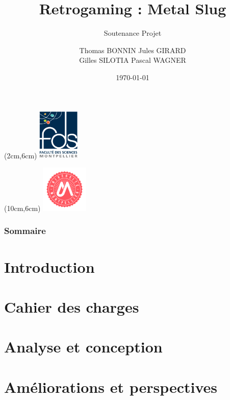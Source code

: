 \documentclass{beamer}
\title[Présentation]{Retrogaming : Metal Slug}
\subtitle[\ldots]{Soutenance Projet}
\author[BONNIN GIRARD SILOTIA WAGNER]{Thomas BONNIN Jules GIRARD \\ Gilles SILOTIA Pascal WAGNER}
\institute[UM2]{Université de Montpellier}
\institute[UM2]{Université de Montpellier \\ Faculté des Sciences}
\date{\today}
\begin{document}
		
		\begingroup
			\makeatletter
				\setlength{\hoffset}{-.5\beamer@sidebarwidth}
			\makeatother
			\begin{frame}[plain]
				\begin{textblock*}{2cm}(2cm,6cm) %
					\includegraphics[width=2cm]{figures/logo_fds.png}
				\end{textblock*}
				\begin{textblock*}{2.25cm}(10cm,6cm) %
					\includegraphics[width=2.25cm]{figures/logo_um.png}
				\end{textblock*}
				\titlepage
			\end{frame}
		\endgroup
		
		\begin{frame}
			\frametitle{Sommaire}
			\tableofcontents[hideallsubsections]
		\end{frame}
		
		\section{Introduction}
		
		
		\section{Cahier des charges}
		
		
		\section{Analyse et conception}
		
		 
		\section{Améliorations et perspectives}
		
		
\end{document}
